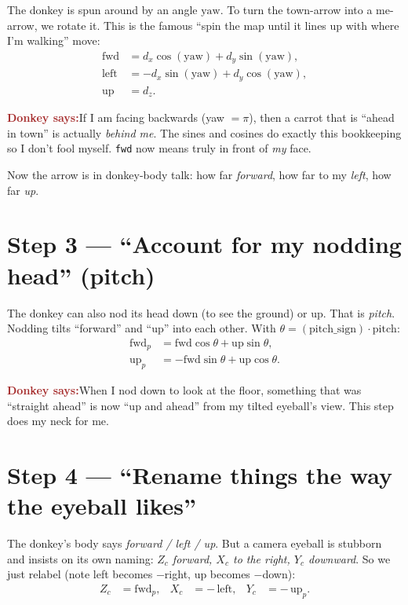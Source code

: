 \documentclass[11pt]{article}
\newcommand{\donkey}[1]{%
  \begin{mdframed}[backgroundcolor=brown!8, linecolor=brown!50, linewidth=1pt,
                   roundcorner=6pt, skipabove=8pt, skipbelow=8pt]
  \textbf{\textcolor{brown}{\large Donkey says:}}\quad #1
  \end{mdframed}}
\begin{document}
The donkey is spun around by an angle $\text{yaw}$. To turn the town-arrow into a
me-arrow, we rotate it. This is the famous ``spin the map until it lines up with
where I'm walking'' move:
\begin{align}
\text{fwd}  &= d_x\cos(\text{yaw}) + d_y\sin(\text{yaw}), \\
\text{left} &= -d_x\sin(\text{yaw}) + d_y\cos(\text{yaw}), \\
\text{up}   &= d_z .
\end{align}

\donkey{If I am facing backwards (yaw $=\pi$), then a carrot that is ``ahead in
town'' is actually \emph{behind me}. The sines and cosines do exactly this
bookkeeping so I don't fool myself. \texttt{fwd} now means truly in front of
\emph{my} face.}

Now the arrow is in donkey-body talk: how far \emph{forward}, how far to my
\emph{left}, how far \emph{up}.

\section{Step 3 --- ``Account for my nodding head'' (pitch)}

The donkey can also nod its head down (to see the ground) or up. That is
\emph{pitch}. Nodding tilts ``forward'' and ``up'' into each other. With
$\theta = (\text{pitch\_sign})\cdot\text{pitch}$:
\begin{align}
\text{fwd}_p &= \text{fwd}\cos\theta + \text{up}\sin\theta, \\
\text{up}_p  &= -\text{fwd}\sin\theta + \text{up}\cos\theta .
\end{align}

\donkey{When I nod down to look at the floor, something that was ``straight
ahead'' is now ``up and ahead'' from my tilted eyeball's view. This step does my
neck for me.}

\section{Step 4 --- ``Rename things the way the eyeball likes''}

The donkey's body says \emph{forward / left / up}. But a camera eyeball is
stubborn and insists on its own naming: \emph{$Z_c$ forward, $X_c$ to the
right, $Y_c$ downward}. So we just relabel (note left becomes $-$right, up
becomes $-$down):
\begin{align}
Z_c &= \text{fwd}_p, & X_c &= -\,\text{left}, & Y_c &= -\,\text{up}_p .
\end{align}
\end{document}
